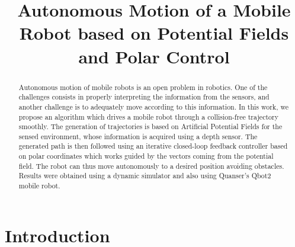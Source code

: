 \documentclass[conference]{IEEEtran}
\begin{document}
\title{Autonomous Motion of a Mobile Robot based on Potential Fields and Polar Control}
\author{
}
\maketitle
\begin{abstract}
  Autonomous motion of mobile robots is an open problem in robotics. One of the challenges consists in properly interpreting the information from the sensors, and another challenge is to adequately move according to this information.
  In this work, we propose an algorithm which drives a mobile robot through a
  collision-free trajectory smoothly. The generation of trajectories is based
  on Artificial Potential Fields for the sensed environment, whose information
  is acquired using a depth sensor. The generated path is then followed using
  an iterative closed-loop feedback controller based on polar coordinates which
  works guided by the vectors coming from the potential field. The robot can
  thus move autonomously to a desired position avoiding obstacles. Results were
  obtained using a dynamic simulator and also using Quanser's Qbot2 mobile
  robot.
\end{abstract}
\IEEEpeerreviewmaketitle

\section{Introduction}
\end{document}
